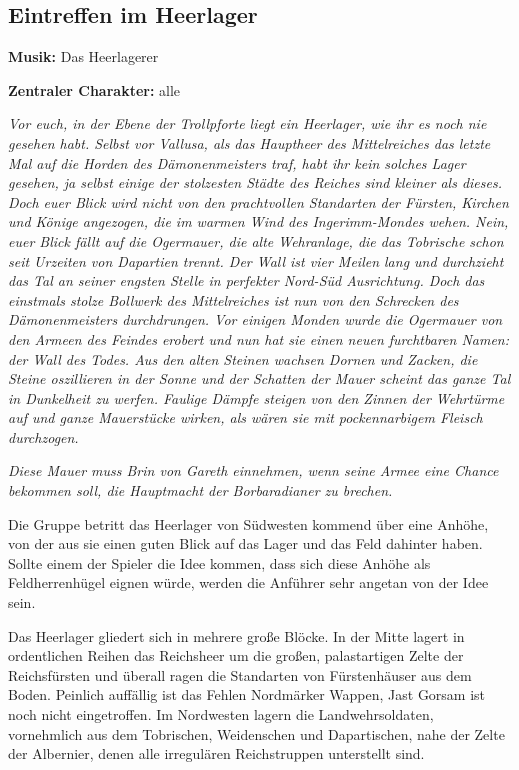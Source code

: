 \subsection{Eintreffen im Heerlager}

\textbf{Musik:} Das Heerlagerer

\textbf{Zentraler Charakter:} alle 

\emph{Vor euch, in der Ebene der Trollpforte liegt ein Heerlager, wie ihr es noch nie gesehen habt. Selbst vor Vallusa, als das Hauptheer des Mittelreiches das letzte Mal auf die Horden des Dämonenmeisters traf, habt ihr kein solches Lager gesehen, ja selbst einige der stolzesten Städte des Reiches sind kleiner als dieses. Doch euer Blick wird nicht von den prachtvollen Standarten der Fürsten, Kirchen und Könige angezogen, die im warmen Wind des Ingerimm-Mondes wehen. Nein, euer Blick fällt auf die Ogermauer, die alte Wehranlage, die das Tobrische schon seit Urzeiten von Dapartien trennt. Der Wall ist vier Meilen lang und durchzieht das Tal an seiner engsten Stelle in perfekter Nord-Süd Ausrichtung. Doch das einstmals stolze Bollwerk des Mittelreiches ist nun von den Schrecken des Dämonenmeisters durchdrungen. Vor einigen Monden wurde die Ogermauer von den Armeen des Feindes erobert und nun hat sie einen neuen furchtbaren Namen: der Wall des Todes. Aus den alten Steinen wachsen Dornen und Zacken, die Steine oszillieren in der Sonne und der Schatten der Mauer scheint das ganze Tal in Dunkelheit zu werfen. Faulige Dämpfe steigen von den Zinnen der Wehrtürme auf und ganze Mauerstücke wirken, als wären sie mit pockennarbigem Fleisch durchzogen.} 

\emph{Diese Mauer muss Brin von Gareth einnehmen, wenn seine Armee eine Chance bekommen soll, die Hauptmacht der Borbaradianer zu brechen.} 

Die Gruppe betritt das Heerlager von Südwesten kommend über eine Anhöhe, von der aus sie einen guten Blick auf das Lager und das Feld dahinter haben. Sollte einem der Spieler die Idee kommen, dass sich diese Anhöhe als Feldherrenhügel eignen würde, werden die Anführer sehr angetan von der Idee sein.

Das Heerlager gliedert sich in mehrere große Blöcke. In der Mitte lagert in ordentlichen Reihen das Reichsheer um die großen, palastartigen Zelte der Reichsfürsten und überall ragen die Standarten von Fürstenhäuser aus dem Boden. Peinlich auffällig ist das Fehlen Nordmärker Wappen, Jast Gorsam ist noch nicht eingetroffen. Im Nordwesten lagern die Landwehrsoldaten, vornehmlich aus dem Tobrischen, Weidenschen und Dapartischen, nahe der Zelte der Albernier, denen alle irregulären Reichstruppen unterstellt sind.

